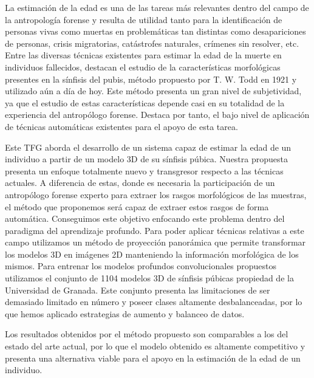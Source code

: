 


La estimación de la edad es una de las tareas más relevantes dentro del campo de la antropología forense y resulta de utilidad tanto para la identificación de personas vivas como muertas en problemáticas tan distintas como desapariciones de personas, crisis migratorias, catástrofes naturales, crímenes sin resolver, etc. 
Entre las diversas técnicas existentes para estimar la edad de la muerte en individuos fallecidos, destacan el estudio de la características morfológicas presentes en la sínfisis del pubis, método propuesto por T. W. Todd en 1921 y utilizado aún a día de hoy. Este método presenta un gran nivel de subjetividad, ya que el estudio de estas características depende casi en su totalidad de la experiencia del antropólogo forense. Destaca por tanto, el bajo nivel de aplicación de técnicas automáticas existentes para el apoyo de esta tarea.


Este TFG aborda el desarrollo de un sistema capaz de estimar la edad de un individuo a partir de un modelo 3D de su sínfisis púbica. Nuestra propuesta presenta un enfoque totalmente nuevo y transgresor respecto a las técnicas actuales. A diferencia de estas, donde es necesaria la participación de un antropólogo forense experto para extraer los rasgos morfológicos de las muestras, el método que proponemos será capaz de extraer estos rasgos de forma automática. Conseguimos este objetivo enfocando este problema dentro del paradigma del aprendizaje profundo. Para poder aplicar técnicas relativas a este campo utilizamos un método de proyección panorámica que permite transformar los modelos 3D en imágenes 2D manteniendo la información morfológica de los mismos. Para entrenar los modelos profundos convolucionales propuestos utilizamos el conjunto de 1104 modelos 3D de sínfisis púbicas propiedad de la Universidad de Granada. Este conjunto presenta las limitaciones de ser demasiado limitado en número y poseer clases altamente desbalanceadas, por lo que hemos aplicado estrategias de aumento y balanceo de datos.

Los resultados obtenidos por el método propuesto son comparables a los del estado del arte actual, por lo que el modelo obtenido es altamente competitivo y presenta una alternativa viable para el apoyo en la estimación de la edad de un individuo.